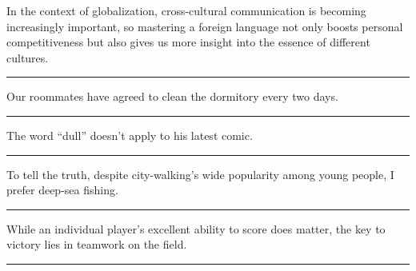 \documentclass[11pt,a4paper]{article}
\newcommand{\num}[1]{\makebox[1.9em][r]{#1.}\hspace{0.3em}}
\newcommand{\wline}{\noindent\rule{\linewidth}{0.4pt}}
\begin{document}
\begin{minipage}{\linewidth}

\num{4}In the context of globalization, cross-cultural communication is becoming increasingly important, so mastering a foreign language not only boosts personal competitiveness but also gives us more insight into the essence of different cultures.

\vspace{0.25em}

\wline

\end{minipage}

\vspace{0.35em}\vspace{0.15em}

\begin{minipage}{\linewidth}

\num{5}Our roommates have agreed to clean the dormitory every two days.

\vspace{0.25em}

\wline

\end{minipage}

\begin{minipage}{\linewidth}

\num{6}The word “dull” doesn’t apply to his latest comic.

\vspace{0.25em}

\wline

\end{minipage}

\begin{minipage}{\linewidth}

\num{7}To tell the truth, despite city-walking’s wide popularity among young people, I prefer deep-sea fishing.

\vspace{0.25em}

\wline

\end{minipage}

\begin{minipage}{\linewidth}

\num{8}While an individual player’s excellent ability to score does matter, the key to victory lies in teamwork on the field.

\vspace{0.25em}

\wline

\end{minipage}
\end{document}
